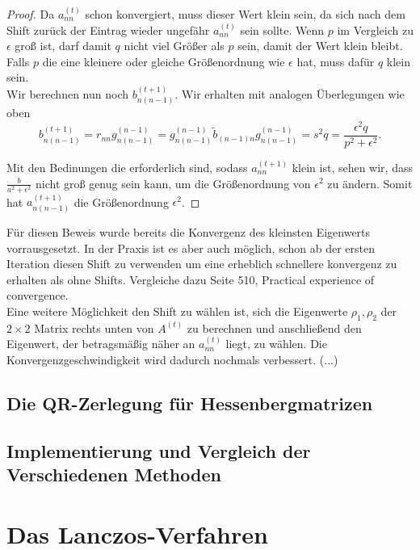 \documentclass{article}
\begin{document}
\begin{proof}
Da $a^{(t)}_{nn}$ schon konvergiert, muss dieser Wert klein sein, da sich nach dem Shift zurück der Eintrag wieder ungefähr $a^{(t)}_{nn}$ sein sollte. Wenn $p$ im Vergleich zu $\epsilon$ groß ist, darf damit $q$ nicht viel Größer als $p$ sein, damit der Wert klein bleibt. Falls $p$ die eine kleinere oder gleiche Größenordnung wie $\epsilon$ hat, muss dafür $q$ klein sein.\\

Wir berechnen nun noch $b^{(t+1)}_{n(n-1)}$. Wir erhalten mit analogen Überlegungen wie oben
\begin{equation*}
	b^{(t+1)}_{n(n-1)} = r_{nn} g^{(n-1)}_{n(n-1)} = g^{(n-1)}_{n(n-1)} \tilde{b}_{(n-1)n} g^{(n-1)}_{n(n-1)} = s^2q = \frac{\epsilon^2 q}{p^2+\epsilon^2}.
\end{equation*}

Mit den Bedinungen die erforderlich sind, sodass $a^{(t+1)}_{nn}$ klein ist, sehen wir, dass $\frac{b}{a^2+\epsilon^2}$ nicht groß genug sein kann, um die Größenordnung von $\epsilon^2$ zu ändern. Somit hat $a^{(t+1)}_{n(n-1)}$ die Größenordnung $\epsilon^2$.
\end{proof}

Für diesen Beweis wurde bereits die Konvergenz des kleinsten Eigenwerts vorrausgesetzt. In der Praxis ist es aber auch möglich, schon ab der ersten Iteration diesen Shift zu verwenden um eine erheblich schnellere konvergenz zu erhalten als ohne Shifts. Vergleiche dazu \cite{The Algebraic Eigenvalue Problem} Seite 510, Practical experience of convergence.\\

Eine weitere Möglichkeit den Shift zu wählen ist, sich die Eigenwerte $\rho_1, \rho_2$ der $2 \times 2$ Matrix rechts unten von $A^{(t)}$ zu berechnen und anschließend den Eigenwert, der betragsmäßig näher an $a^{(t)}_{nn}$ liegt, zu wählen. Die Konvergenzgeschwindigkeit wird dadurch nochmals verbessert. (...)


\subsection{Die QR-Zerlegung für Hessenbergmatrizen}

\subsection{Implementierung und Vergleich der Verschiedenen Methoden}


\section{Das Lanczos-Verfahren}
\end{document}
